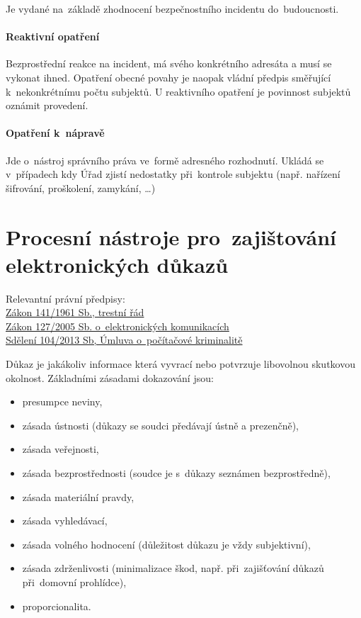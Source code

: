 Je vydané na~základě zhodnocení bezpečnostního incidentu do~budoucnosti.

\paragraph{Reaktivní opatření}

Bezprostřední reakce na incident, má svého konkrétního adresáta a musí se vykonat ihned.
Opatření obecné povahy je naopak vládní předpis směřující k~nekonkrétnímu počtu subjektů.
U reaktivního opatření je povinnost subjektů oznámit provedení.

\paragraph{Opatření k~nápravě}

Jde o~nástroj správního práva ve~formě adresného rozhodnutí.
Ukládá se v~případech kdy Úřad zjistí nedostatky při~kontrole subjektu (např. nařízení šifrování, proškolení, zamykání, \dots)


\clearpage
\section{Procesní nástroje pro~zajištování elektronických důkazů}

{}Relevantní právní předpisy:
\\\href{https://www.zakonyprolidi.cz/cs/1961-141}{Zákon 141/1961 Sb., trestní řád}
\\\href{https://www.zakonyprolidi.cz/cs/2005-127}{Zákon 127/2005 Sb. o~elektronických komunikacích}
\\\href{https://www.zakonyprolidi.cz/ms/2013-104}{Sdělení 104/2013 Sb, Úmluva o~počítačové kriminalitě}

Důkaz je jakákoliv informace která vyvrací nebo potvrzuje libovolnou skutkovou okolnost.
Základními zásadami dokazování jsou:
\vspace*{-1em}\begin{itemize}
\item presumpce neviny,
\item zásada ústnosti (důkazy se soudci předávají ústně a prezenčně),
\item zásada veřejnosti,
\item zásada bezprostřednosti (soudce je s~důkazy seznámen bezprostředně),
\item zásada materiální pravdy,
\item zásada vyhledávací,
\item zásada volného hodnocení (důležitost důkazu je vždy subjektivní),
\item zásada zdrženlivosti (minimalizace škod, např. při~zajišťování důkazů při~domovní prohlídce),
\item proporcionalita.
\end{itemize}

